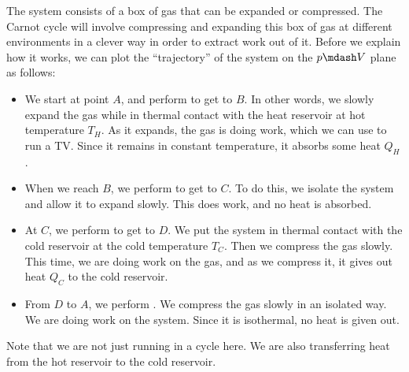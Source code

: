\documentclass[a4paper]{article}
\begin{document}
The system consists of a box of gas that can be expanded or compressed. The Carnot cycle will involve compressing and expanding this box of gas at different environments in a clever way in order to extract work out of it. Before we explain how it works, we can plot the ``trajectory'' of the system on the $p\mdash V$ plane as follows:
\begin{center}
\end{center}
\begin{itemize}
  \item We start at point $A$, and perform  to get to $B$. In other words, we slowly expand the gas while in thermal contact with the heat reservoir at hot temperature $T_H$. As it expands, the gas is doing work, which we can use to run a TV. Since it remains in constant temperature, it absorbs some heat $Q_H$.
  \item When we reach $B$, we perform  to get to $C$. To do this, we isolate the system and allow it to expand slowly. This does work, and no heat is absorbed.
  \item At $C$, we perform  to get to $D$. We put the system in thermal contact with the cold reservoir at the cold temperature $T_C$. Then we compress the gas slowly. This time, we are doing work on the gas, and as we compress it, it gives out heat $Q_C$ to the cold reservoir.
  \item From $D$ to $A$, we perform . We compress the gas slowly in an isolated way. We are doing work on the system. Since it is isothermal, no heat is given out.
\end{itemize}
Note that we are not just running in a cycle here. We are also transferring heat from the hot reservoir to the cold reservoir.
\end{document}
